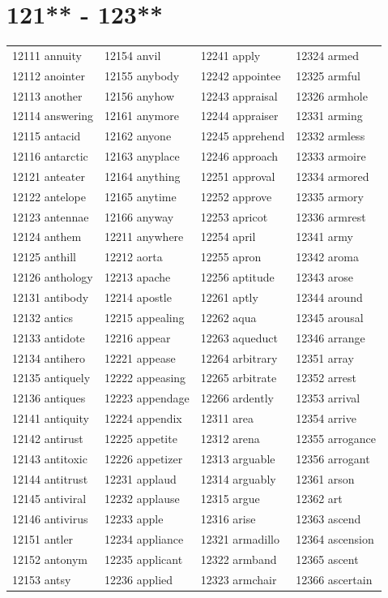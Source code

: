 \documentclass[10pt, oneside]{book}
\begin{document}
\begin{table}
	\centering
	\section*{121** - 123**}
	\begin{tabular}{l l l l}
12111 annuity &12154 anvil &12241 apply &12324 armed\\
12112 anointer &12155 anybody &12242 appointee &12325 armful\\
12113 another &12156 anyhow &12243 appraisal &12326 armhole\\
12114 answering &12161 anymore &12244 appraiser &12331 arming\\
12115 antacid &12162 anyone &12245 apprehend &12332 armless\\
12116 antarctic &12163 anyplace &12246 approach &12333 armoire\\
12121 anteater &12164 anything &12251 approval &12334 armored\\
12122 antelope &12165 anytime &12252 approve &12335 armory\\
12123 antennae &12166 anyway &12253 apricot &12336 armrest\\
12124 anthem &12211 anywhere &12254 april &12341 army\\
12125 anthill &12212 aorta &12255 apron &12342 aroma\\
12126 anthology &12213 apache &12256 aptitude &12343 arose\\
12131 antibody &12214 apostle &12261 aptly &12344 around\\
12132 antics &12215 appealing &12262 aqua &12345 arousal\\
12133 antidote &12216 appear &12263 aqueduct &12346 arrange\\
12134 antihero &12221 appease &12264 arbitrary &12351 array\\
12135 antiquely &12222 appeasing &12265 arbitrate &12352 arrest\\
12136 antiques &12223 appendage &12266 ardently &12353 arrival\\
12141 antiquity &12224 appendix &12311 area &12354 arrive\\
12142 antirust &12225 appetite &12312 arena &12355 arrogance\\
12143 antitoxic &12226 appetizer &12313 arguable &12356 arrogant\\
12144 antitrust &12231 applaud &12314 arguably &12361 arson\\
12145 antiviral &12232 applause &12315 argue &12362 art\\
12146 antivirus &12233 apple &12316 arise &12363 ascend\\
12151 antler &12234 appliance &12321 armadillo &12364 ascension\\
12152 antonym &12235 applicant &12322 armband &12365 ascent\\
12153 antsy &12236 applied &12323 armchair &12366 ascertain\\
	\end{tabular}
 \end{table}
\clearpage
\end{document}
